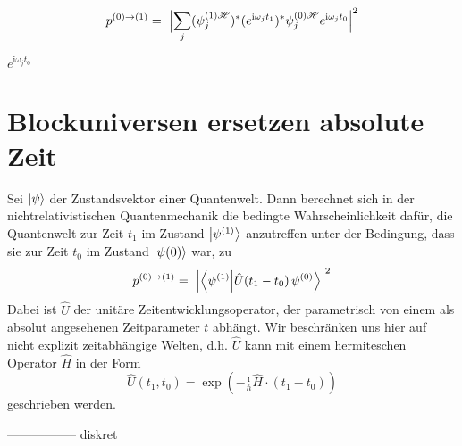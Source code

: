 \documentclass[12pt]{article}
\begin{document}
\begin{equation} 
p^{(0)\rightarrow(1)} =\ 
\Bigl| \sum_j
(\psi_j^{(1)\mathscr{H}})^* (e^{\mathrm{i}\omega_j t_1})^*
\psi_j^{(0)\mathscr{H}} e^{\mathrm{i}\omega_j t_0}
 \Bigr|^2
\end{equation}

$e^{\mathrm{i}\omega_j t_0}$

\section{Blockuniversen ersetzen absolute Zeit}
Sei $\ket{\psi}$ der Zustandsvektor einer Quantenwelt. Dann berechnet sich in der nichtrelativistischen Quantenmechanik die bedingte Wahrscheinlichkeit dafür, die Quantenwelt zur Zeit $t_1$ im Zustand $\ket{\psi^{(1)}}$ anzutreffen unter der Bedingung, dass sie zur Zeit $t_0$ im Zustand  $\ket{\psi{(0)}}$ war, zu
\begin{equation} 
\label{eq:conditional_probability}
p^{(0)\rightarrow(1)} =\ \Bigl| \bra{\psi^{(1)}}\ket{\hat{U}(t_1-t_0)\,\psi^{(0)}} \Bigr|^2
\end{equation}
Dabei ist $\hat{U}$ der unitäre Zeitentwicklungsoperator, der parametrisch von einem als absolut angesehenen Zeitparameter $t$ abhängt. Wir beschränken uns hier auf nicht explizit zeitabhängige Welten, d.h. $\hat{U}$ kann mit einem hermiteschen Operator $\hat{H}$ in der Form
\begin{equation}
\label{eq:time_evolution}
\hat{U}(t_1,t_0)=\exp \left(-\tfrac {\mathrm {i} }{\hbar}\hat{H}\cdot (t_1-t_0)\right)
\end{equation}
geschrieben werden. 


-----------------
diskret
\end{document}
